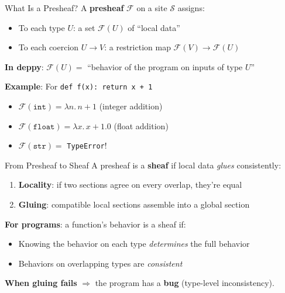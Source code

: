 \documentclass[aspectratio=169,11pt]{beamer}
\newcommand{\site}{\mathcal{S}}
\begin{document}
\begin{frame}{What Is a Presheaf?}
A \textbf{presheaf} $\mathcal{F}$ on a site $\site$ assigns:
\begin{itemize}
\item To each type $U$: a set $\mathcal{F}(U)$ of ``local data''
\item To each coercion $U \to V$: a restriction map $\mathcal{F}(V) \to \mathcal{F}(U)$
\end{itemize}

\vspace{0.5em}
\textbf{In deppy}: $\mathcal{F}(U) = $ ``behavior of the program on inputs of type $U$''

\vspace{0.5em}
\textbf{Example}: For \texttt{def f(x): return x + 1}
\begin{itemize}
\item $\mathcal{F}(\texttt{int}) = \lambda n.\, n + 1$ (integer addition)
\item $\mathcal{F}(\texttt{float}) = \lambda x.\, x + 1.0$ (float addition)
\item $\mathcal{F}(\texttt{str}) = $ \texttt{TypeError}!
\end{itemize}
\end{frame}

\begin{frame}{From Presheaf to Sheaf}
A presheaf is a \textbf{sheaf} if local data \emph{glues} consistently:

\begin{enumerate}
\item \textbf{Locality}: if two sections agree on every overlap, they're equal
\item \textbf{Gluing}: compatible local sections assemble into a global section
\end{enumerate}

\vspace{0.5em}
\textbf{For programs}: a function's behavior is a sheaf if:
\begin{itemize}
\item Knowing the behavior on each type \emph{determines} the full behavior
\item Behaviors on overlapping types are \emph{consistent}
\end{itemize}

\vspace{0.5em}
\textbf{When gluing fails} $\Rightarrow$ the program has a \textbf{bug} (type-level inconsistency).
\end{frame}
\end{document}
